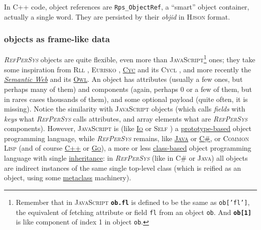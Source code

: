 \documentclass[11pt,a4paper,svgnames]{article}
\newcommand{\RefPerSys}{{\textit{\textsc{RefPerSys}}}}
\begin{document}
In C++ code, object references are \texttt{Rps\_ObjectRef}, a
``smart'' object container, actually a single word. They are persisted
by their \textit{objid} in \textsc{Hjson} format.

\subsubsection{objects as frame-like data}
\label{subsubsec:obj-frame}

{\RefPerSys} objects are quite flexible, even more than
\textsc{JavaScript}\footnote{Remember that in \textsc{JavaScript}
\textbf{\texttt{ob.fl}} is defined to be the same as
\texttt{ob['fl']}, the equivalent of fetching attribute or field
\texttt{fl} from an object \texttt{ob}. And \textbf{\texttt{ob[1]}} is
like component of index 1 in object \texttt{ob}.} ones; they take some
inspiration from \textsc{Rll} \cite{greiner:1980:representation},
\textsc{Eurisko} \cite{Lenat:1983:Eurisko, Lenat:1983:theory},
\href{https://en.wikipedia.org/wiki/Cyc}{\textsc{Cyc}} and its
\textsc{Cycl} \cite{Lenat:1991:ev-cycl}, and more recently the
\href{https://en.wikipedia.org/wiki/Semantic_Web}{\textit{Semantic
    Web}} and its
\href{https://www.w3.org/TR/owl-ref/}{\textsc{Owl}}. An object has
attributes (usually a few ones, but perhaps many of them) and
components (again, perhaps 0 or a few of them, but in rares cases
thousands of them), and some optional payload (quite often, it is
missing). Notice the similarity with \textsc{JavaScript} objects
(which calls \emph{fields} with \emph{keys} what {\RefPerSys} calls
attributes, and array elements what are {\RefPerSys}
components). However, \textsc{JavaScript} is (like
\href{http://iolanguage.com/}{\textsc{Io}} or \textsc{Self}
\cite{chambers:1991:efficient}) a
\href{https://en.wikipedia.org/wiki/Prototype-based_programming}{prototype-based}
object programming language, while {\RefPerSys} remains, like
\href{https://en.wikipedia.org/wiki/Java_(programming_language)}{\textsc{Java}}
or
\href{https://en.wikipedia.org/wiki/C_Sharp_(programming_language)}{\textsc{C\#}},
or \textsc{Common Lisp} (and of course
\href{https://en.cppreference.com/w/cpp}{\textsc{C++}} or
\href{https://golang.org/}{\textsc{Go}}), a more or less
\href{https://en.wikipedia.org/wiki/Class_(computer_programming)}{class-based}
object programming language with single
\href{https://en.wikipedia.org/wiki/Inheritance_(object-oriented_programming)}{inheritance}:
in {\RefPerSys} (like in \textsc{C\#} or \textsc{Java}) all objects
are indirect instances of the same single top-level class (which is
reified as an object, using some
\href{https://en.wikipedia.org/wiki/Metaclass}{metaclass} machinery).
\end{document}
